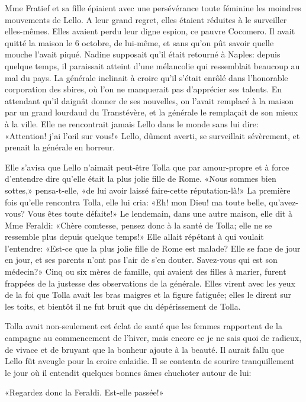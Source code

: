 Mme Fratief et sa fille épiaient avec une persévérance toute féminine
les moindres mouvements de Lello. A leur grand regret, elles étaient
réduites à le surveiller elles-mêmes. Elles avaient perdu leur digne
espion, ce pauvre Cocomero. Il avait quitté la maison le 6 octobre, de
lui-même, et sans qu'on pût savoir quelle mouche l'avait piqué. Nadine
supposait qu'il était retourné à Naples: depuis quelque temps, il
paraissait atteint d'une mélancolie qui ressemblait beaucoup au mal du
pays. La générale inclinait à croire qu'il s'était enrôlé dans
l'honorable corporation des sbires, où l'on ne manquerait pas
d'apprécier ses talents. En attendant qu'il daignât donner de ses
nouvelles, on l'avait remplacé à la maison par un grand lourdaud du
Transtévère, et la générale le remplaçait de son mieux à la ville. Elle
ne rencontrait jamais Lello dans le monde sans lui dire: «Attention!
j'ai l'œil sur vous!» Lello, dûment averti, se surveillait sévèrement,
et prenait la générale en horreur.

Elle s'avisa que Lello n'aimait peut-être Tolla que par amour-propre et
à force d'entendre dire qu'elle était la plus jolie fille de Rome. «Nous
sommes bien sottes,» pensa-t-elle, «de lui avoir laissé faire-cette
réputation-là!» La première fois qu'elle rencontra Tolla, elle lui cria:
«Eh! mon Dieu! ma toute belle, qu'avez-vous? Vous êtes toute défaite!»
Le lendemain, dans une autre maison, elle dit à Mme Feraldi: «Chère
comtesse, pensez donc à la santé de Tolla; elle ne se ressemble plus
depuis quelque temps!» Elle allait répétant à qui voulait l'entendre:
«Est-ce que la plus jolie fille de Rome est malade? Elle se fane de jour
en jour, et ses parents n'ont pas l'air de s'en douter. Savez-vous qui
est son médecin?» Cinq ou six mères de famille, qui avaient des filles à
marier, furent frappées de la justesse des observations de la générale.
Elles virent avec les yeux de la foi que Tolla avait les bras maigres et
la figure fatiguée; elles le dirent sur les toits, et bientôt il ne fut
bruit que du dépérissement de Tolla.

Tolla avait non-seulement cet éclat de santé que les femmes rapportent
de la campagne au commencement de l'hiver, mais encore ce je ne sais
quoi de radieux, de vivace et de bruyant que la bonheur ajoute à la
beauté. Il aurait fallu que Lello fût aveugle pour la croire enlaidie.
Il se contenta de sourire tranquillement le jour où il entendit quelques
bonnes âmes chuchoter autour de lui:

«Regardez donc la Feraldi. Est-elle passée!»

